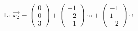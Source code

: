 \documentclass[preview]{standalone}
\begin{document}
\begin{center}
$\mathrm{L: \:} \vec{x_2} = \begin{pmatrix} 0 \\ 0 \\ 3 \end{pmatrix} + \begin{pmatrix} -1 \\ -2 \\ -1 \end{pmatrix} \cdot \mathrm{s} + \begin{pmatrix} -1 \\ 1 \\ -2 \end{pmatrix} \cdot \mathrm{t}$
\end{center}
\end{document}
